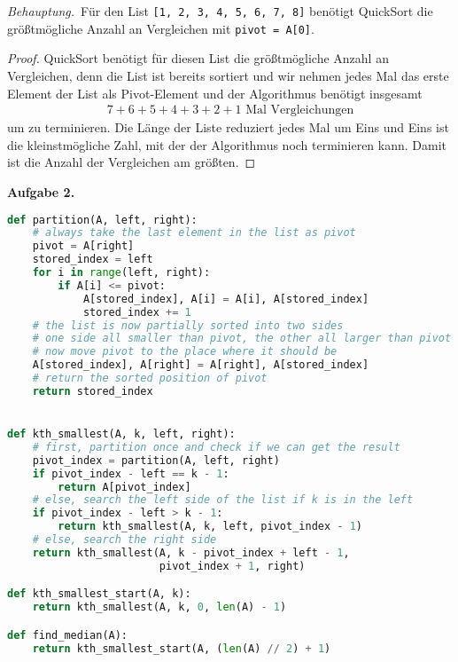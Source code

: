 \documentclass[12pt]{extarticle}
\newcommand{\aufgn}[1]{\textbf{Aufgabe #1.}}
\newcommand{\beh}{\textit{Behauptung.}\ }
\begin{document}
\beh Für den List \texttt{[1, 2, 3, 4, 5, 6, 7, 8]}
benötigt QuickSort die größtmögliche Anzahl an
Vergleichen mit \texttt{pivot = A[0]}.

\begin{proof}
QuickSort benötigt für diesen List die größtmögliche
Anzahl an Vergleichen, denn die List ist bereits sortiert
und wir nehmen jedes Mal das erste Element der List als
Pivot-Element und der Algorithmus benötigt insgesamt
\begin{align*}
7+6+5+4+3+2+1 \text{ Mal Vergleichungen}
\end{align*}
um zu terminieren.  Die Länge der Liste reduziert jedes
Mal um Eins und Eins ist die kleinstmögliche Zahl, mit
der der Algorithmus noch terminieren kann.  Damit ist
die Anzahl der Vergleichen am größten.
\end{proof}

\newpage

\aufgn{2}

\begin{lstlisting}[language=Python]
def partition(A, left, right):
    # always take the last element in the list as pivot
    pivot = A[right]
    stored_index = left
    for i in range(left, right):
        if A[i] <= pivot:
            A[stored_index], A[i] = A[i], A[stored_index]
            stored_index += 1
    # the list is now partially sorted into two sides
    # one side all smaller than pivot, the other all larger than pivot
    # now move pivot to the place where it should be
    A[stored_index], A[right] = A[right], A[stored_index]
    # return the sorted position of pivot
    return stored_index


def kth_smallest(A, k, left, right):
    # first, partition once and check if we can get the result
    pivot_index = partition(A, left, right)
    if pivot_index - left == k - 1:
        return A[pivot_index]
    # else, search the left side of the list if k is in the left
    if pivot_index - left > k - 1:
        return kth_smallest(A, k, left, pivot_index - 1)
    # else, search the right side
    return kth_smallest(A, k - pivot_index + left - 1,
                        pivot_index + 1, right)

def kth_smallest_start(A, k):
    return kth_smallest(A, k, 0, len(A) - 1)

def find_median(A):
    return kth_smallest_start(A, (len(A) // 2) + 1)
\end{lstlisting}
\end{document}
